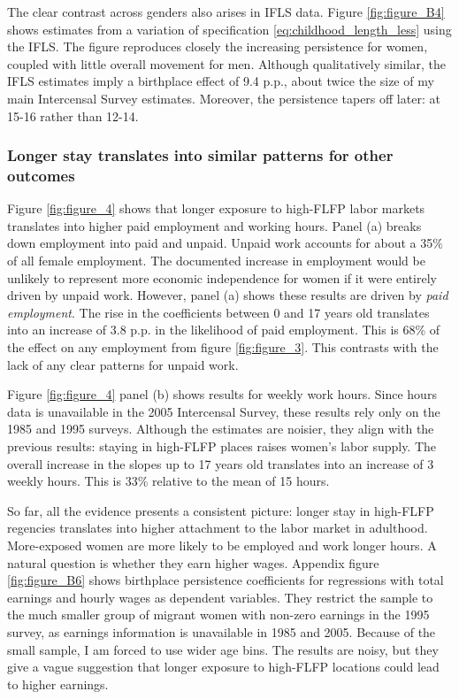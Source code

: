 The clear contrast across genders also arises in IFLS data.  Figure  \ref{fig:figure_B4} shows estimates from a variation of specification \eqref{eq:childhood_length_less} using the IFLS. The figure reproduces closely the increasing persistence for women, coupled with little overall movement for men. Although qualitatively similar, the IFLS estimates imply a birthplace effect of 9.4 p.p., about twice the size of my main Intercensal Survey estimates. Moreover, the persistence tapers off later: at 15-16 rather than 12-14.

\subsubsection{Longer stay translates into similar patterns for other outcomes}
Figure \ref{fig:figure_4} shows that longer exposure to high-FLFP labor markets translates into higher paid employment and working hours. Panel (a) breaks down employment into paid and unpaid. Unpaid work accounts for about a 35\% of all female employment. The documented increase in employment would be unlikely to represent more economic independence for women if it were entirely driven by unpaid work. However, panel (a) shows these results are driven by \emph{paid employment}. 
The rise in the coefficients between 0 and 17 years old translates into an increase of 3.8 p.p. in the likelihood of paid employment. 
This is 68\% of the effect on any employment from figure  \ref{fig:figure_3}. This contrasts with the lack of any clear patterns for unpaid work.


Figure \ref{fig:figure_4}  panel (b)  shows results for weekly work hours. Since hours data is unavailable in the 2005 Intercensal Survey, these results rely only on the 1985 and 1995 surveys. Although the estimates are noisier, they align with the previous results: staying in high-FLFP places raises women's labor supply. The overall increase in the slopes up to 17 years old translates into an increase of 3 weekly hours. This is 33\% relative to the mean of 15 hours.

So far, all the evidence presents a consistent picture: longer stay in high-FLFP regencies translates into higher attachment to the labor market in adulthood. More-exposed women are more likely to be employed and work longer hours. A natural question is whether they earn higher wages. Appendix figure \ref{fig:figure_B6} shows birthplace persistence coefficients for regressions with total earnings and hourly wages as dependent variables. They restrict the sample to the much smaller group of migrant women with non-zero earnings in the 1995 survey, as earnings information is unavailable in 1985 and 2005. Because of the small sample, I am forced to use wider age bins. The results are noisy, but they give a vague suggestion that longer exposure to high-FLFP locations could lead to higher earnings. 

